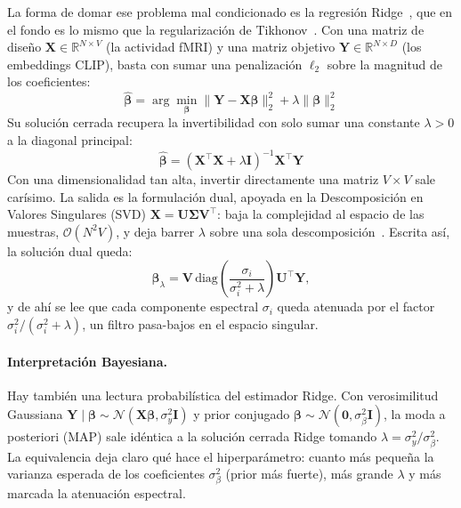 La forma de domar ese problema mal condicionado es la regresión Ridge~\cite{hoerl1970ridge}, 
que en el fondo es lo mismo que la regularización de Tikhonov~\cite{tikhonov1977solutions}. 
Con una matriz de diseño $\mathbf{X}\in\mathbb{R}^{N\times V}$ (la actividad fMRI) y una matriz 
objetivo $\mathbf{Y}\in\mathbb{R}^{N\times D}$ (los embeddings CLIP), basta con sumar una 
penalización $\ell_2$ sobre la magnitud de los coeficientes:
\begin{equation}
\hat{\boldsymbol{\beta}} = \arg\min_{\boldsymbol{\beta}} \|\mathbf{Y} - \mathbf{X}\boldsymbol{\beta}\|_2^2 + \lambda\|\boldsymbol{\beta}\|_2^2
\end{equation}
Su solución cerrada recupera la invertibilidad con solo sumar una constante $\lambda > 0$ a la diagonal principal:
\begin{equation}
\hat{\boldsymbol{\beta}} = (\mathbf{X}^\top\mathbf{X} + \lambda\mathbf{I})^{-1}\mathbf{X}^\top\mathbf{Y}
\end{equation}
Con una dimensionalidad tan alta, invertir directamente una matriz $V\times V$ sale carísimo. La salida es la formulación dual, apoyada en la Descomposición en Valores Singulares (SVD) $\mathbf{X} = \mathbf{U}\boldsymbol{\Sigma}\mathbf{V}^\top$: baja la complejidad al espacio de las muestras, $\mathcal{O}(N^2 V)$, y deja barrer $\lambda$ sobre una sola descomposición~\cite{hastie2009elements}. Escrita así, la solución dual queda:
\begin{equation}
\hat{\boldsymbol{\beta}}_\lambda = \mathbf{V}\,\text{diag}\!\left(\frac{\sigma_i}{\sigma_i^2 + \lambda}\right)\mathbf{U}^\top\mathbf{Y},
\end{equation}
y de ahí se lee que cada componente espectral $\sigma_i$ queda atenuada por el factor $\sigma_i^2/(\sigma_i^2+\lambda)$, un filtro pasa-bajos en el espacio singular.

\paragraph{Interpretación Bayesiana.} Hay también una lectura probabilística del estimador 
Ridge. Con verosimilitud Gaussiana 
$\mathbf{Y}\!\mid\!\boldsymbol{\beta} \sim \mathcal{N}(\mathbf{X}\boldsymbol{\beta},\sigma_y^2\mathbf{I})$ 
y prior conjugado $\boldsymbol{\beta}\sim\mathcal{N}(\mathbf{0},\sigma_\beta^2\mathbf{I})$, la 
moda a posteriori (MAP) sale idéntica a la solución cerrada Ridge tomando 
$\lambda = \sigma_y^2/\sigma_\beta^2$. La equivalencia deja claro qué hace el hiperparámetro: 
cuanto más pequeña la varianza esperada de los coeficientes $\sigma_\beta^2$ (prior más fuerte), 
más grande $\lambda$ y más marcada la atenuación espectral.

